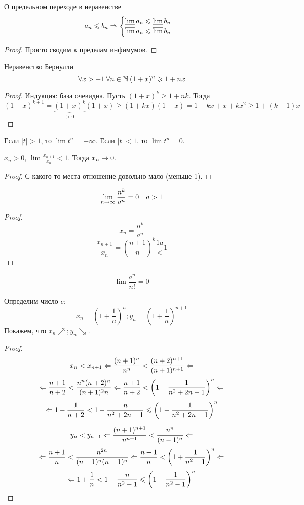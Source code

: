\begin{theorem}{О предельном переходе в неравенстве}
$$a_n \leqslant b_n \Rightarrow \begin{cases}\varliminf a_n \leqslant \varliminf b_n \\ \varlimsup a_n \leqslant \varlimsup b_n\end{cases}$$
\end{theorem}                                                                                                                       
\begin{proof}
Просто сводим к пределам инфимумов. 
\end{proof}

\begin{theorem}{Неравенство Бернулли}
$$\forall x>-1\: \forall n \in \mathbb{N}\: (1+x)^n \geqslant 1 + nx$$
\end{theorem}
\begin{proof}
Индукция: база очевидна. Пусть $(1+x)^k \geqslant 1 + nk$. Тогда
$$(1+x)^{k+1} = \underbrace{(1+x)^k}_{>0} (1+x) \geqslant (1+kx)(1+x) = 1 + kx + x + kx^2 \geqslant 1 + (k+1)x$$
\end{proof}
\begin{conseq}
Если $|t| > 1$, то $\lim t^n = +\infty$. Если $|t| < 1$, то $\lim t^n = 0$.
\end{conseq}

\begin{theorem}{}
$x_n > 0$, $\lim \frac{x_{n+1}}{x_n} < 1$. Тогда $x_n \rightarrow 0$.
\end{theorem}
\begin{proof}
С какого-то места отношение довольно мало (меньше 1).
\end{proof}
\begin{conseq}
$$\lim_{n\rightarrow\infty} \frac{n^k}{a^n} = 0\quad a>1$$
\end{conseq}
\begin{proof}
$$x_n = \frac{n^k}{a^n}$$
$$\frac{x_{n+1}}{x_n} = \left(\frac{n+1}n\right)^k \frac{1a} < 1$$
\end{proof}
\begin{conseq}
$$\lim \frac{a^n}{n!} = 0$$
\end{conseq}

Определим число $e$:
$$x_n = \left(1+\frac1n\right)^n; y_n=\left(1+\frac1n\right)^{n+1}$$
Покажем, что $x_n \nearrow; y_n \searrow$.
\begin{proof}
$$x_n < x_{n+1} \Leftarrow \frac{(n+1)^n}{n^n} < \frac{(n+2)^{n+1}}{(n+1)^{n+1}} \Leftarrow$$
$$\Leftarrow \frac{n+1}{n+2} < \frac{n^n(n+2)^n}{(n+1)^2n} \Leftarrow \frac{n+1}{n+2} < \left(1-\frac1{n^2+2n-1}\right)^n \Leftarrow $$
$$\Leftarrow 1 - \frac{1}{n+2} < 1 - \frac{n}{n^2+2n-1} \leqslant \left(1-\frac1{n^2+2n-1}\right)^n$$

$$y_n < y_{n-1} \Leftarrow \frac{(n+1)^{n+1}}{n^{n+1}} < \frac{n^n}{(n-1)^n} \Leftarrow$$
$$\Leftarrow \frac{n+1}{n} < \frac{n^{2n}}{(n-1)^n(n+1)^n} \Leftarrow \frac{n+1}{n} < \left(1+\frac1{n^2-1}\right)^n \Leftarrow $$
$$\Leftarrow 1 + \frac1n < 1 - \frac{n}{n^2-1} \leqslant \left(1-\frac1{n^2-1}\right)^n$$
\end{proof}

